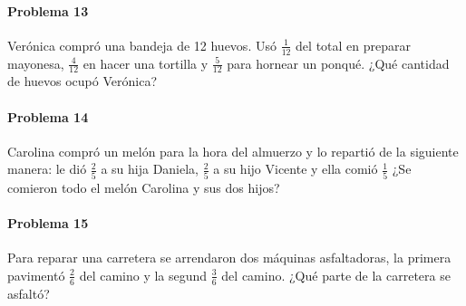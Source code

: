 \documentclass[10pt,twoside]{article}
\begin{document}
\paragraph*{Problema 13}
Verónica compró una bandeja de 12 huevos. Usó $\frac{1}{12}$ del total en preparar mayonesa, $\frac{4}{12}$ en hacer una tortilla y $\frac{5}{12}$ para hornear un ponqué. ¿Qué cantidad de huevos ocupó Verónica?
\paragraph*{Problema 14}
Carolina compró un melón para la hora del almuerzo y lo repartió de la siguiente manera: le dió $\frac{2}{5}$ a su hija Daniela, $\frac{2}{5}$ a su hijo Vicente y ella comió $\frac{1}{5}$ ¿Se comieron todo el melón Carolina y sus dos hijos?
\paragraph*{Problema 15}
Para reparar una carretera se arrendaron dos máquinas asfaltadoras, la primera pavimentó $\frac{2}{6}$ del camino y la segund $\frac{3}{6}$ del camino. ¿Qué parte de la carretera se asfaltó?
\end{document}
